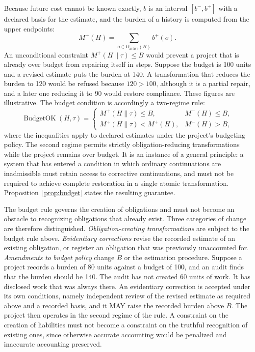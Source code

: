 \documentclass[11pt]{article}
\theoremstyle{remark}
\newcommand{\concat}{\mathbin{\|}}
\begin{document}
Because future cost cannot be known exactly, $b$ is an interval $[b^{-},b^{+}]$ with a declared basis for the estimate, and the burden of a history is computed from the upper endpoints:
\[
M^{+}(H)=\sum_{o\in O_{\mathrm{active}}(H)}b^{+}(o).
\]
An unconditional constraint $M^{+}(H\concat\tau)\le B$ would prevent a project that is already over budget from repairing itself in steps. Suppose the budget is 100 units and a revised estimate puts the burden at 140. A transformation that reduces the burden to 120 would be refused because $120>100$, although it is a partial repair, and a later one reducing it to 90 would restore compliance. These figures are illustrative. The budget condition is accordingly a two-regime rule:
\[
\operatorname{BudgetOK}(H,\tau)=
\begin{cases}
M^{+}(H\concat\tau)\le B, & M^{+}(H)\le B,\\[4pt]
M^{+}(H\concat\tau)<M^{+}(H), & M^{+}(H)>B,
\end{cases}
\]
where the inequalities apply to declared estimates under the project's budgeting policy. The second regime permits strictly obligation-reducing transformations while the project remains over budget. It is an instance of a general principle: a system that has entered a condition in which ordinary continuations are inadmissible must retain access to corrective continuations, and must not be required to achieve complete restoration in a single atomic transformation. Proposition~\ref{prop:budget} states the resulting guarantee.

The budget rule governs the creation of obligations and must not become an obstacle to recognizing obligations that already exist. Three categories of change are therefore distinguished. \emph{Obligation-creating transformations} are subject to the budget rule above. \emph{Evidentiary corrections} revise the recorded estimate of an existing obligation, or register an obligation that was previously unaccounted for. \emph{Amendments to budget policy} change $B$ or the estimation procedure. Suppose a project records a burden of 80 units against a budget of 100, and an audit finds that the burden should be 140. The audit has not created 60 units of work. It has disclosed work that was always there. An evidentiary correction is accepted under its own conditions, namely independent review of the revised estimate as required above and a recorded basis, and it MAY raise the recorded burden above $B$. The project then operates in the second regime of the rule. A constraint on the creation of liabilities must not become a constraint on the truthful recognition of existing ones, since otherwise accurate accounting would be penalized and inaccurate accounting preserved.
\end{document}

